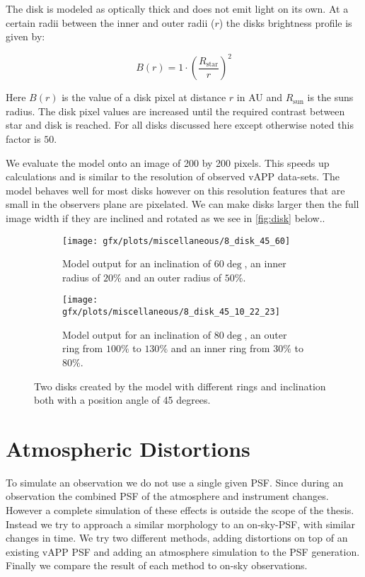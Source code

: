 The disk is modeled as optically thick and does not emit light on its own. At a certain radii between the inner and outer radii ($r$) the disks brightness profile is given by:

\begin{equation}
B(r) = 1 \cdot {\left(\frac{R_{\text{star}}}{r}\right)}^2
\end{equation}

Here $B(r)$ is the value of a disk pixel at distance $r$ in AU and $R_\text{sun}$ is the suns radius. The disk pixel values are increased until the required contrast between star and disk is reached. For all disks discussed here except otherwise noted this factor is $50$.

We evaluate the model onto an image of 200 by 200 pixels. This speeds up calculations and is similar to the resolution of observed \ac{vAPP} data-sets. The model behaves well for most disks however on this resolution features that are small in the observers plane are pixelated. We can make disks larger then the full image width if they are inclined and rotated as we see in \autoref{fig:disk} below..

\begin{figure}[h!]
  \begin{subfigure}[t]{0.5\textwidth}
    \texttt{[image: gfx/plots/miscellaneous/8\_disk\_45\_60]}
    \caption{Model output for an inclination of $60\deg$, an inner radius of $20\%$ and an outer radius of $50\%$.}
  \end{subfigure}
  \begin{subfigure}[t]{0.5\textwidth}
    \texttt{[image: gfx/plots/miscellaneous/8\_disk\_45\_10\_22\_23]}
    \caption{Model output for an inclination of $80\deg$, an outer ring from $100\%$ to $130\%$ and an inner ring from $30\%$ to $80\%$.}
  \end{subfigure}
  \caption{Two disks created by the model with different rings and inclination both with a position angle of 45 degrees.}
  \label{fig:disk}
\end{figure}





\section{Atmospheric Distortions}

To simulate an observation we do not use a single given \ac{PSF}. Since during an observation the combined \ac{PSF}  of the atmosphere and instrument changes. However a complete simulation of these effects is outside the scope of the thesis. Instead we try to approach a similar morphology to an on-sky-\ac{PSF}, with similar changes in time. We try two different methods, adding distortions on top of an existing \ac{vAPP} \ac{PSF} and adding an atmosphere simulation to the PSF generation. Finally we compare the result of each method to on-sky observations.

